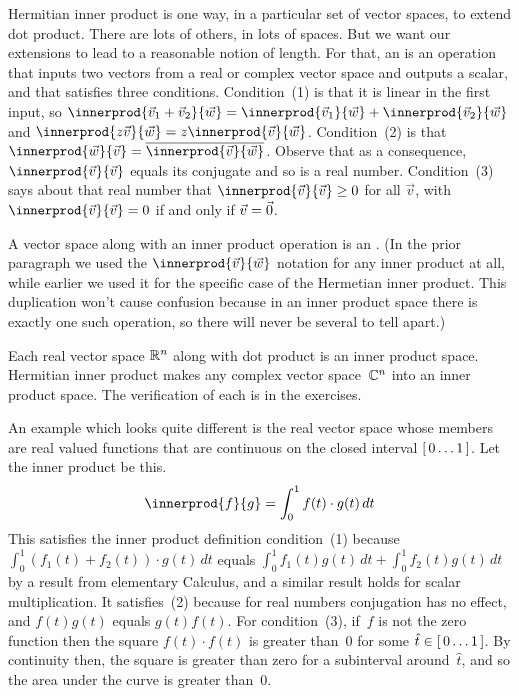 Hermitian inner product is one way, in a particular set of vector spaces, 
to extend dot product.
There are lots of others, in lots of spaces.
But we want our extensions to lead to a reasonable notion of length.
For that,
an  is an operation
that inputs two vectors from a real or complex vector space 
and outputs a scalar, and that
satisfies three conditions.
Condition~(1) is that it is linear in the first input, so
$\innerprod{\vec{v}_1+\vec{v}_2}{\vec{w}}
 = \innerprod{\vec{v}_1}{\vec{w}}
   +\innerprod{\vec{v}_2}{\vec{w}}$
and $\innerprod{z\vec{v}}{\vec{w}}
     =z\innerprod{\vec{v}}{\vec{w}}$.
Condition~(2) is that
$\innerprod{\vec{w}}{\vec{v}}=\compconj{\innerprod{\vec{v}}{\vec{w}}}$.
Observe that as a consequence, 
$\innerprod{\vec{v}}{\vec{v}}$ equals its conjugate and
so is a real number.
Condition~(3) says about that real number that
$\innerprod{\vec{v}}{\vec{v}}\geq 0$ for all $\vec{v}$, with 
$\innerprod{\vec{v}}{\vec{v}}= 0$ if and only if $\vec{v}=\vec{0}$.

A vector space along with an inner product operation is an
.
(In the prior paragraph we used the $\innerprod{\vec{v}}{\vec{w}}$ notation 
for any inner product at all, while earlier we used it for the specific case of
the Hermetian inner product.
This duplication won't cause confusion because in an inner product space there
is exactly one such operation, so there will never be several to tell apart.)

Each real vector space $\mathbb{R}^n$ along with dot product is an inner product space. 
Hermitian inner product makes any complex vector space~$\mathbb{C}^n$ into 
an inner product space.
The verification of each is in the exercises.

An example which looks quite different 
is the real vector space whose members are
real valued functions that are continuous on the 
closed interval $[\,0\ldots 1\,]$.
Let the inner product be this.
\begin{equation*}
  \innerprod{f}{g}=\int_{0}^1 f(t)\cdot g(t)\,dt
\end{equation*}
This satisfies the inner product definition
condition~(1) because  
$\int_{0}^1 (f_1(t)+f_2(t))\cdot g(t)\,dt$ equals 
$\int_{0}^1 f_1(t)g(t)\,dt+\int_{0}^1 f_2(t)g(t)\,dt$
by a result from elementary Calculus,
and a similar result holds for scalar multiplication. 
It satisfies~(2) because for real numbers conjugation has no effect,
and $f(t)g(t)$ equals $g(t)f(t)$. 
For condition~(3), if~$f$ is not the zero function then 
the square $f(t)\cdot f(t)$ is greater than~$0$ for some 
$\hat{t}\in [\,0\ldots 1\,]$.
By continuity then, the square is greater than zero for a subinterval
around~$\hat{t}$,
and so the area under the curve is greater than~$0$.

